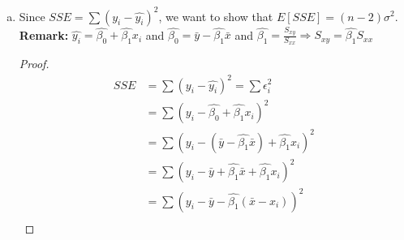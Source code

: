 \documentclass[12pt]{article}
\begin{document}
\begin{enumerate}[1.]
\begin{enumerate}[(a)]
\begin{proof}
            \[=  \beta_1 \sum \frac{(x_i - \bar{x})^2}{(x_i - \bar{x})^2}  \]
            \[E[\hat{\beta_1}] =  \beta_1 \]
            Now we can proof that $Var[\hat{\beta_1}] = \frac{\sigma^2}{S_{xx}}$ 
            \[Var[\hat{\beta_1}] = Var[\frac{\sum  (x_i - \bar{x})(y_i - \bar{y})}{\sum  (x_i - \bar{x})^2}] \]
            \[= Var[\frac{\sum  (x_i - \bar{x})(\hat{\beta_0} + \hat{\beta_1} x_i + \epsilon_i - \bar{y})}{\sum  (x_i - \bar{x})^2}] \]
            \[= Var[\frac{\sum  (x_i - \bar{x})\hat{\beta_0} + \sum  (x_i - \bar{x})\hat{\beta_1} x_i + \sum  (x_i - \bar{x})\epsilon_i - \sum  (x_i - \bar{x})\bar{y}}{\sum  (x_i - \bar{x})^2}] \]
            \[= Var[\frac{\hat{\beta_0} \sum  (x_i - \bar{x}) + \hat{\beta_1} \sum  (x_i - \bar{x}) x_i + \sum  (x_i - \bar{x})\epsilon_i - \bar{y} \sum  (x_i - \bar{x})}{\sum  (x_i - \bar{x})^2}] \]
            \[= Var[\frac{\hat{\beta_0} \cdot 0 + \hat{\beta_1} \cdot 0 + \sum  (x_i - \bar{x})\epsilon_i - \bar{y} \cdot 0}{\sum  (x_i - \bar{x})^2}] \]
            \[= Var[\frac{\sum (x_i - \bar{x}) \epsilon_i}{S_{xx}}] \]
            \[= \frac{(x_i - \bar{x})^2}{S_{xx}^2} Var[\epsilon_i]\]
            \[= \frac{S_{xx}}{S_{xx}^2} \sigma^2\]
            \[ Var[\hat{\beta_1}]= \frac{\sigma^2}{S_{xx}} \]
            \end{proof}
            $\therefore$ We can conclude that because, the $E[\hat{\beta_1}] = \beta_1$ and $Var[\hat{\beta_1}]= \frac{\sigma^2}{S_{xx}}$, and we can safely say that $\hat{\beta_1} \sim N(\beta_1, \frac{\sigma^2}{S_{xx}})$
            \item Since $SSE = \sum (y_i - \hat{y_i})^2$, we want to show that $E[SSE] = (n - 2)\sigma^2$.
            \textbf{Remark:} $\hat{y_i} = \hat{\beta_0} + \hat{\beta_1} x_i$ and 
            $\hat{\beta_0} = \bar{y} - \hat{\beta_1} \bar{x}$ and 
            $\hat{\beta_1} = \frac{S_{xy}}{S_{xx}} \Rightarrow S_{xy} = \hat{\beta_1}S_{xx}$
            \begin{proof}
                \begin{align*}
                    SSE &= \sum (y_i - \hat{y_i})^2 = \sum \epsilon_i^2\\
                    &= \sum (y_i - \hat{\beta_0} + \hat{\beta_1} x_i)^2 \\
                    &= \sum (y_i - (\bar{y} - \hat{\beta_1} \bar{x}) + \hat{\beta_1} x_i)^2 \\
                    &= \sum (y_i - \bar{y} + \hat{\beta_1} \bar{x} + \hat{\beta_1} x_i)^2 \\
                    &= \sum (y_i - \bar{y} - \hat{\beta_1} (\bar{x} - x_i))^2 \\

\end{align*}
\end{proof}
\end{enumerate}
\end{enumerate}
\end{document}

